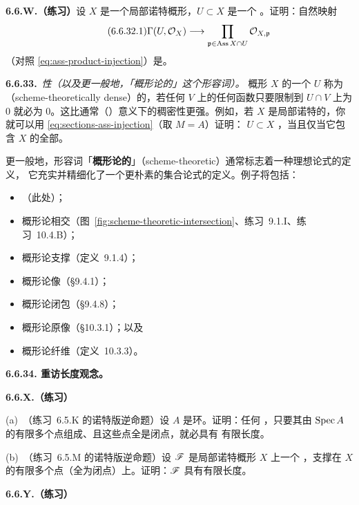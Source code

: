 \textbf{6.6.W.（练习）}\quad 设 $X$ 是一个局部诺特概形，$U\subset X$ 是一个%
\trOpenSubscheme。证明：自然映射
\begin{equation*}\tag{6.6.32.1}\label{eq:sections-ass-injection}
\Gamma(U,\mathcal{O}_X)\longrightarrow\prod\limits_{\mathfrak{p}\in\operatorname{Ass}X\cap U}
  \mathcal{O}_{X,\mathfrak{p}}
\end{equation*}
（对照 \eqref{eq:ass-product-injection}）是\trInjectiveMap。

\textbf{6.6.33.}\ \emph{\trSchemeTheoreticallyDense{}性（以及更一般地，「概形论的」这个形容词）。}\quad
概形 $X$ 的一个\trOpenSubscheme{} $U$ 称为\textbf{\trSchemeTheoreticallyDense{}}（scheme-theoretically
dense）的，若任何\trOpenSet{} $V$ 上的任何函数只要限制到 $U\cap V$ 上为 $0$ 就必为
$0$。这比通常（\trTopology）意义下的稠密性更强。例如，若 $X$ 是局部诺特的，你就可以用%
\trInjectiveMap{} \eqref{eq:sections-ass-injection}（取 $M=A$）证明：\trOpenSubscheme{}
$U\subset X$ \trSchemeTheoreticallyDense{}，当且仅当它包含 $X$ 的全部\trAssociatedPoint。

更一般地，形容词「\textbf{概形论的}」（scheme-theoretic）通常标志着一种理想论式的定义，
它充实并精细化了一个更朴素的集合论式的定义。例子将包括：
\begin{itemize}[leftmargin=2.6em,itemsep=2pt,topsep=3pt]
\item \trSchemeTheoreticallyDense{}（此处）；
\item 概形论相交（图~\ref{fig:scheme-theoretic-intersection}、练习~9.1.I、练习~10.4.B）；
\item 概形论支撑（定义~9.1.4）；
\item 概形论像（\S9.4.1）；
\item 概形论闭包（\S9.4.8）；
\item 概形论原像（\S10.3.1）；以及
\item 概形论纤维（定义~10.3.3）。
\end{itemize}

\textbf{6.6.34. 重访长度观念。}

\textbf{6.6.X.（练习）}

(a)~（练习~6.5.K 的诺特版逆命题）设 $A$ 是\trNoetherian{}环。证明：任何\trFinitelyGenerated{}%
\trModule，只要其\trSupport{}由 $\operatorname{Spec} A$ 的有限多个点组成、且这些点全是闭点，就必具有
有限长度。

(b)~（练习~6.5.M 的诺特版逆命题）设 $\mathscr{F}$ 是局部诺特概形 $X$ 上一个\trFiniteType{}%
\trQCSheaf，支撑在 $X$ 的有限多个点（全为闭点）上。证明：$\mathscr{F}$ 具有有限长度。

\textbf{6.6.Y.（练习）}

